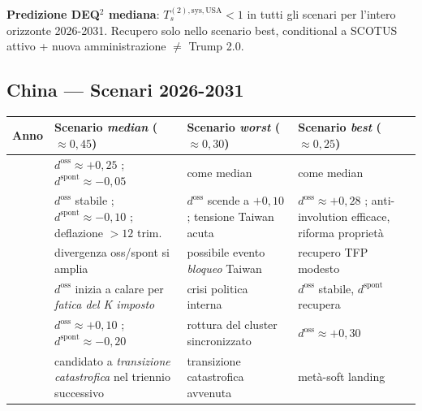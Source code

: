 \Conj{} \textbf{Predizione DEQ$^2$ mediana}:
\(T_s^{(2),\text{sys},\text{USA}} < 1\) in tutti gli scenari per
l'intero orizzonte 2026-2031. Recupero solo nello scenario best,
conditional a SCOTUS attivo + nuova amministrazione \(\neq\) Trump 2.0.

\subsection{China --- Scenari 2026-2031}\label{cina-scenari-2026-2031}

{\def\LTcaptype{none} %
{\small\begin{longtable}[]{@{}
  >{\raggedright\arraybackslash}p{}
  >{\raggedright\arraybackslash}p{}
  >{\raggedright\arraybackslash}p{}
  >{\raggedright\arraybackslash}p{}@{}}
\toprule\noalign{}
\begin{minipage}[b]{\linewidth}\raggedright
Anno
\end{minipage} & \begin{minipage}[b]{\linewidth}\raggedright
Scenario \emph{median} (\(\approx 0{,}45\))
\end{minipage} & \begin{minipage}[b]{\linewidth}\raggedright
Scenario \emph{worst} (\(\approx 0{,}30\))
\end{minipage} & \begin{minipage}[b]{\linewidth}\raggedright
Scenario \emph{best} (\(\approx 0{,}25\))
\end{minipage} \\
\midrule\noalign{}
\endhead
\bottomrule\noalign{}
\endlastfoot
2026 & \(d^{\text{oss}} \approx +0{,}25\) ;
\(d^{\text{spont}} \approx -0{,}05\) & come median & come median \\
2027 & \(d^{\text{oss}}\) stabile ; \(d^{\text{spont}} \approx -0{,}10\)
; deflazione \(> 12\) trim. & \(d^{\text{oss}}\) scende a \(+0{,}10\) ;
tensione Taiwan acuta & \(d^{\text{oss}} \approx +0{,}28\) ;
anti-involution efficace, riforma proprietà \\
2028 & divergenza oss/spont si amplia & possibile evento \emph{bloqueo}
Taiwan & recupero TFP modesto \\
2029 & \(d^{\text{oss}}\) inizia a calare per \emph{fatica del K
imposto} & crisi politica interna & \(d^{\text{oss}}\) stabile,
\(d^{\text{spont}}\) recupera \\
2030 & \(d^{\text{oss}} \approx +0{,}10\) ;
\(d^{\text{spont}} \approx -0{,}20\) & rottura del cluster sincronizzato
& \(d^{\text{oss}} \approx +0{,}30\) \\
2031 & candidato a \emph{transizione catastrofica} nel triennio
successivo & transizione catastrofica avvenuta & metà-soft landing \\
\end{longtable}}
}

